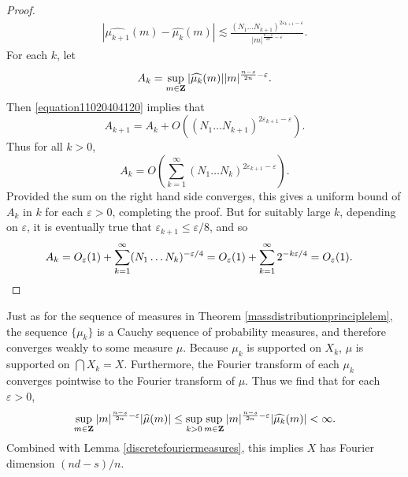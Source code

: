 \begin{proof}
\begin{equation}
    \begin{split}
        |\widehat{\mu_{k+1}}(m) - \widehat{\mu_k}(m)| \lesssim \frac{(N_1 \dots N_{k+1})^{2\varepsilon_{k+1} - \varepsilon}}{|m|^{\frac{n-s}{2n} - \varepsilon}}.
    \end{split}
    \end{equation}
    For each $k$, let
    \[ A_k = \sup_{m \in \operatorname{\mathbf{Z}}} |\widehat{\mu_k}(m)| |m|^{\frac{n-s}{2n} - \varepsilon}. \]
    Then \eqref{equation11020404120} implies that
    \[ A_{k+1} = A_k + O \left( (N_1 \dots N_{k+1})^{2\varepsilon_{k+1} - \varepsilon} \right). \]
    Thus for all $k > 0$,
    \[ A_k = O \left( \sum_{k = 1}^\infty (N_1 \dots N_k)^{2\varepsilon_{k+1} - \varepsilon} \right). \]
    Provided the sum on the right hand side converges, this gives a uniform bound of $A_k$ in $k$ for each $\varepsilon > 0$, completing the proof. But for suitably large $k$, depending on $\varepsilon$, it is eventually true that $\varepsilon_{k+1} \leq \varepsilon/8$, and so
    \begin{align*}
        A_k &= O_\varepsilon(1) + \sum_{k = 1}^\infty (N_1 \dots N_k)^{-\varepsilon/4} = O_\varepsilon(1) + \sum_{k = 1}^\infty 2^{-k\varepsilon/4} = O_\varepsilon(1). \qedhere
    \end{align*}
\end{proof}

Just as for the sequence of measures in Theorem \ref{massdistributionprinciplelem}, the sequence $\{ \mu_k \}$ is a Cauchy sequence of probability measures, and therefore converges weakly to some measure $\mu$. Because $\mu_k$ is supported on $X_k$, $\mu$ is supported on $\bigcap X_k = X$. Furthermore, the Fourier transform of each $\mu_k$ converges pointwise to the Fourier transform of $\mu$. Thus we find that for each $\varepsilon > 0$,
%
\[ \sup_{m \in \operatorname{\mathbf{Z}}} |m|^{\frac{n-s}{2n} - \varepsilon} |\widehat{\mu}(m)| \leq \sup_{k > 0} \sup_{m \in \operatorname{\mathbf{Z}}} |m|^{\frac{n-s}{2n} - \varepsilon} |\widehat{\mu_k}(m)| < \infty. \]
%
Combined with Lemma \ref{discretefouriermeasures}, this implies $X$ has Fourier dimension $(nd - s)/n$.

\endinput